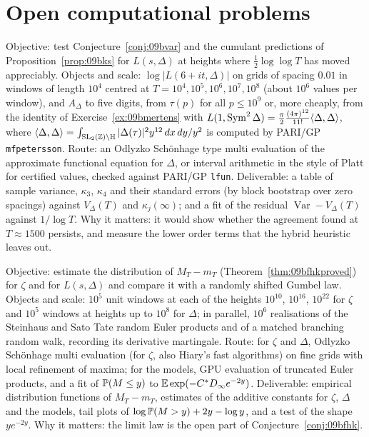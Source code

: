 \section{Open computational problems}

\begin{compproblem}\label{cp:09bselberg}
Objective: test Conjecture~\ref{conj:09bvar} and the cumulant predictions of Proposition~\ref{prop:09bks} for $L(s,\Delta)$ at heights where $\frac12\log\log T$ has moved appreciably. Objects and scale: $\log|L(6+it,\Delta)|$ on grids of spacing $0.01$ in windows of length $10^4$ centred at $T=10^4,10^5,10^6,10^7,10^8$ (about $10^6$ values per window), and $A_\Delta$ to five digits, from $\tau(p)$ for all $p\le10^9$ or, more cheaply, from the identity of Exercise~\ref{ex:09bmertens} with $L(1,\operatorname{Sym}^2\Delta)=\frac{\pi}{2}\frac{(4\pi)^{12}}{11!}\langle\Delta,\Delta\rangle$, where $\langle\Delta,\Delta\rangle=\int_{\mathrm{SL}_2(\mathbb{Z})\backslash\mathbb H}|\Delta(\tau)|^2y^{12}\,dx\,dy/y^2$ is computed by PARI/GP \texttt{mfpetersson}. Route: an Odlyzko Sch\"onhage type multi evaluation \cite{odlyzkoschonhage1988} of the approximate functional equation for $\Delta$, or interval arithmetic in the style of Platt for certified values, checked against PARI/GP \texttt{lfun}. Deliverable: a table of sample variance, $\kappa_3$, $\kappa_4$ and their standard errors (by block bootstrap over zero spacings) against $V_\Delta(T)$ and $\kappa_j(\infty)$; and a fit of the residual $\operatorname{Var}-V_\Delta(T)$ against $1/\log T$. Why it matters: it would show whether the agreement found at $T\approx1500$ persists, and measure the lower order terms that the hybrid heuristic leaves out.
\end{compproblem}

\begin{compproblem}\label{cp:09bmax}
Objective: estimate the distribution of $M_T-m_T$ (Theorem~\ref{thm:09bfhkproved}) for $\zeta$ and for $L(s,\Delta)$ and compare it with a randomly shifted Gumbel law. Objects and scale: $10^5$ unit windows at each of the heights $10^{10}$, $10^{16}$, $10^{22}$ for $\zeta$ and $10^5$ windows at heights up to $10^8$ for $\Delta$; in parallel, $10^6$ realisations of the Steinhaus and Sato Tate random Euler products and of a matched branching random walk, recording its derivative martingale. Route: for $\zeta$ and $\Delta$, Odlyzko Sch\"onhage multi evaluation \cite{odlyzkoschonhage1988} (for $\zeta$, also Hiary's fast algorithms) on fine grids with local refinement of maxima; for the models, GPU evaluation of truncated Euler products, and a fit of $\mathbb{P}(M\le y)$ to $\mathbb{E}\exp(-C^*D_\infty e^{-2y})$. Deliverable: empirical distribution functions of $M_T-m_T$, estimates of the additive constants for $\zeta$, $\Delta$ and the models, tail plots of $\log\mathbb{P}(M>y)+2y-\log y$, and a test of the shape $ye^{-2y}$. Why it matters: the limit law is the open part of Conjecture~\ref{conj:09bfhk}.
\end{compproblem}

